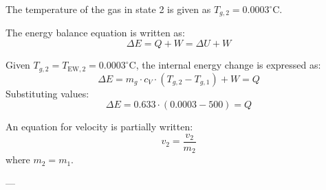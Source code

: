 The temperature of the gas in state 2 is given as \( T_{g,2} = 0.0003^\circ\text{C} \).  

The energy balance equation is written as:  
\[
\Delta E = Q + W = \Delta U + W
\]  

Given \( T_{g,2} = T_{\text{EW},2} = 0.0003^\circ\text{C} \), the internal energy change is expressed as:  
\[
\Delta E = m_g \cdot c_V \cdot (T_{g,2} - T_{g,1}) + W = Q
\]  
Substituting values:  
\[
\Delta E = 0.633 \cdot (0.0003 - 500) = Q
\]  

An equation for velocity is partially written:  
\[
v_{2} = \frac{v_2}{m_2}
\]  
where \( m_2 = m_1 \).  

---